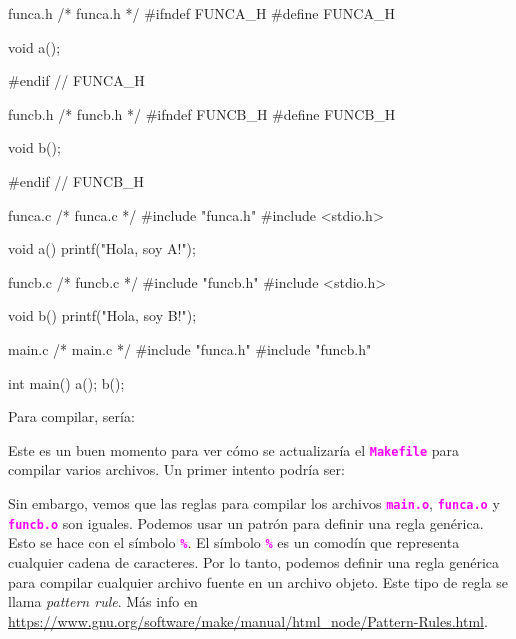 \documentclass[]{scrartcl}
\newcommand{\hl}[1]{\textcolor{magenta}{\textbf{\texttt{#1}}}}
\begin{document}
\begin{cbox}[]{funca.h}
  /* funca.h */
  #ifndef FUNCA_H
  #define FUNCA_H
  
  void a();
  
  #endif // FUNCA_H

\end{cbox}

\begin{cbox}[]{funcb.h}
  /* funcb.h */
  #ifndef FUNCB_H
  #define FUNCB_H
  
  void b();
  
  #endif // FUNCB_H

\end{cbox}

\begin{cbox}[]{funca.c}
/* funca.c */
#include "funca.h"
#include <stdio.h>

void a(){
  printf("Hola, soy A!\n");
}
\end{cbox}

\begin{cbox}[]{funcb.c}
  /* funcb.c */
  #include "funcb.h"
  #include <stdio.h>
  
  void b(){
    printf("Hola, soy B!\n");
  }
\end{cbox}

\begin{cbox}[]{main.c}
  /* main.c */
  #include "funca.h"
  #include "funcb.h"
  
  int main(){
    a();
    b();
  }
\end{cbox}

Para compilar, sería:


Este es un buen momento para ver cómo se actualizaría el \hl{Makefile} para compilar varios archivos. Un primer intento podría ser:


Sin embargo, vemos que las reglas para compilar los archivos \hl{main.o}, \hl{funca.o} y \hl{funcb.o} son iguales. Podemos usar un patrón para definir una regla genérica. Esto se hace con el símbolo \hl{\%}. El símbolo \hl{\%} es un comodín que representa cualquier cadena de caracteres. Por lo tanto, podemos definir una regla genérica para compilar cualquier archivo fuente en un archivo objeto. Este tipo de regla se llama \textit{pattern rule}. Más info en \url{https://www.gnu.org/software/make/manual/html_node/Pattern-Rules.html}.
\end{document}
